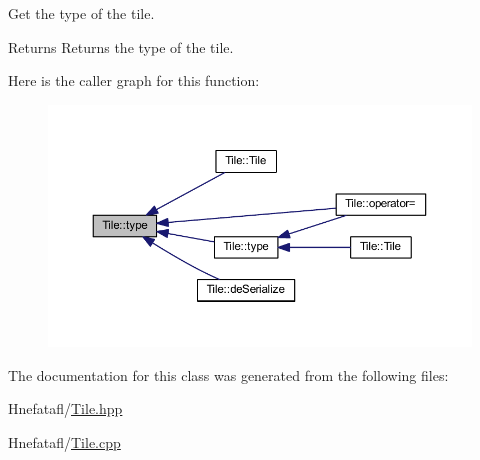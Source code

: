 Get the type of the tile. 

\begin{DoxyReturn}{Returns}
Returns the type of the tile. 
\end{DoxyReturn}


Here is the caller graph for this function\-:
\nopagebreak
\begin{figure}[H]
\begin{center}
\leavevmode
\includegraphics[width=350pt]{class_tile_a816fb8e2d8d48619eccf6e225eca7206_icgraph}
\end{center}
\end{figure}




The documentation for this class was generated from the following files\-:\begin{DoxyCompactItemize}
\item 
Hnefatafl/\hyperlink{_tile_8hpp}{Tile.\-hpp}\item 
Hnefatafl/\hyperlink{_tile_8cpp}{Tile.\-cpp}\end{DoxyCompactItemize}
